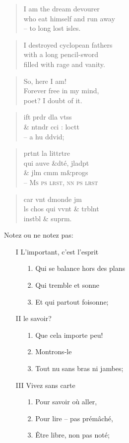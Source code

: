   \begin{verse}
    I am the dream devourer\\
    who eat himself and run away\\
    -- to long lost isles.
  \end{verse}
  \begin{verse}
    I destroyed cyclopean fathers\\
    with a long pencil-sword\\
    filled with rage and vanity.
  \end{verse}
  \begin{verse}
    So, here I am!\\
    Forever free in my mind,\\
    poet? I doubt of it.
  \end{verse}
  \begin{verse}
    ift prdr dla vtss\\
    \& ntndr cci : loctt\\
    -- a hu ddvid;
  \end{verse}
  \begin{verse}
    prtnt la littrtre\\
    qui auve \&dté, jladpt \\
    \& jlm cmm m\&progs    \\
    -- \textsc{Ms ps lrst, nn ps lrst}
  \end{verse}
  \begin{verse}
    car vnt dmonde jm\\
    ls chos qui vvnt \& trblnt\\
    instbl \& suprm.
  \end{verse}
  Notez ou ne notez pas:
  \begin{enumerate}
    \item[I] L’important, c’est l’esprit
    \begin{enumerate}
      \item[1.] Qui se balance hors des plans
      \item[2.] Qui tremble et sonne
      \item[3.] Et qui partout foisonne;
    \end{enumerate}
    \item[II] le savoir?
    \begin{enumerate}
      \item[1.] Que cela importe peu!
      \item[2.] Montrons-le
      \item[3.] Tout nu sans bras ni jambes;
    \end{enumerate}
    \item[III] Vivez sans carte
    \begin{enumerate}
      \item[1.] Pour savoir où aller,
      \item[2.] Pour lire -- pas prémâché,
      \item[3.] Être libre, non pas noté;
    \end{enumerate}
  \end{enumerate}
